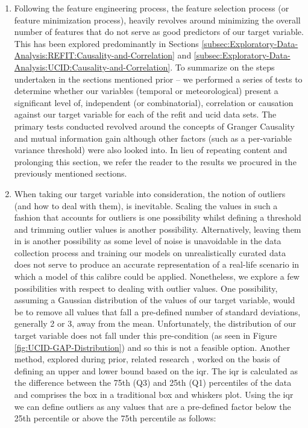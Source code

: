 \begin{adjustwidth}{-1.65cm}{-0.0cm}
\begin{enumerate}[label=Step 3.\arabic*:, leftmargin=*]
    \item Following the feature engineering process, the feature selection process (or feature minimization process), heavily revolves around minimizing the overall number of features that do not serve as good predictors of our target variable. This has been explored predominantly in Sections \ref{subsec:Exploratory-Data-Analysis:REFIT:Causality-and-Correlation} and \ref{subsec:Exploratory-Data-Analysis:UCID:Causality-and-Correlation}. To summarize on the steps undertaken in the sections mentioned prior -- we performed a series of tests to determine whether our variables (temporal or meteorological) present a significant level of, independent (or combinatorial), correlation or causation against our target variable for each of the \gls{refit} and \gls{ucid} data sets. The primary tests conducted revolved around the concepts of Granger Causality and mutual information gain although other factors (such as a per-variable variance threshold) were also looked into. In lieu of repeating content and prolonging this section, we refer the reader to the results we procured in the previously mentioned sections.
    
    \item When taking our target variable into consideration, the notion of outliers (and how to deal with them), is inevitable. Scaling the values in such a fashion that accounts for outliers is one possibility whilst defining a threshold and trimming outlier values is another possibility. Alternatively, leaving them in is another possibility as some level of noise is unavoidable in the data collection process and training our models on unrealistically curated data does not serve to produce an accurate representation of a real-life scenario in which a model of this calibre could be applied. Nonetheless, we explore a few possibilities with respect to dealing with outlier values. One possibility, assuming a Gaussian distribution of the values of our target variable, would be to remove all values that fall a pre-defined number of standard deviations, generally 2 or 3, away from the mean. Unfortunately, the distribution of our target variable does not fall under this pre-condition (as seen in Figure \ref{fig:UCID-GAP-Distribution}) and so this is not a feasible option. Another method, explored during prior, related research \cite{Kareem}, worked on the basis of defining an upper and lower bound based on the \gls{iqr}. The \gls{iqr} is calculated as the difference between the 75th (Q3) and 25th (Q1) percentiles of the data and comprises the box in a traditional box and whiskers plot. Using the \gls{iqr} we can define outliers as any values that are a pre-defined factor below the 25th percentile or above the 75th percentile as follows:
    

\end{enumerate}
\end{adjustwidth}
